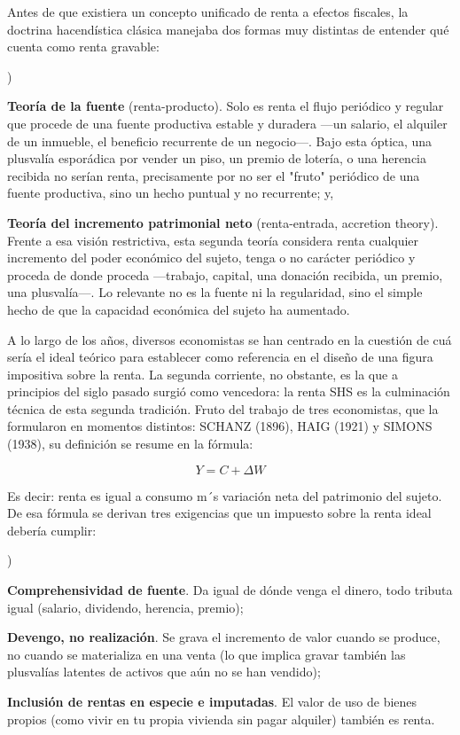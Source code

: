\documentclass[10pt,a4paper]{article}
\newcounter{alphaitem}
\newenvironment{la}
      {\begin{list}{\alph{alphaitem})}{%
          \usecounter{alphaitem}%
          \setlength{\leftmargin}{1cm}%
          \setlength{\parskip}{3pt}%
          \setlength{\itemsep}{0pt}%
          \setlength{\parsep}{0pt}%
      }}
      {\end{list}}
\begin{document}
Antes de que existiera un concepto unificado de renta a efectos fiscales, la doctrina hacendística clásica manejaba dos formas muy distintas de entender qué cuenta como renta gravable:
\begin{la}
    \item \textbf{Teoría de la fuente} (renta-producto). Solo es renta el flujo periódico y regular que procede de una fuente productiva estable y duradera —un salario, el alquiler de un inmueble, el beneficio recurrente de un negocio—. Bajo esta óptica, una plusvalía esporádica por vender un piso, un premio de lotería, o una herencia recibida no serían renta, precisamente por no ser el "fruto" periódico de una fuente productiva, sino un hecho puntual y no recurrente; y,
    \item \textbf{Teoría del incremento patrimonial neto} (renta-entrada, accretion theory). Frente a esa visión restrictiva, esta segunda teoría considera renta cualquier incremento del poder económico del sujeto, tenga o no carácter periódico y proceda de donde proceda —trabajo, capital, una donación recibida, un premio, una plusvalía—. Lo relevante no es la fuente ni la regularidad, sino el simple hecho de que la capacidad económica del sujeto ha aumentado.
\end{la}

A lo largo de los años, diversos economistas se han centrado en la cuestión de cuá sería el ideal teórico para establecer como referencia en el diseño de una figura impositiva sobre la renta. La segunda corriente, no obstante, es la que a principios del siglo pasado surgió como vencedora: la renta SHS es la culminación técnica de esta segunda tradición. Fruto del trabajo de tres economistas, que la formularon en momentos distintos: SCHANZ (1896), HAIG (1921) y SIMONS (1938), su definición se resume en la fórmula:

$$Y=C+\Delta W$$

Es decir: renta es igual a consumo m´s variación neta del patrimonio del sujeto. De esa fórmula se derivan tres exigencias que un impuesto sobre la renta ideal debería cumplir:
\begin{la}
    \item \textbf{Comprehensividad de fuente}. Da igual de dónde venga el dinero, todo tributa igual (salario, dividendo, herencia, premio);
    \item \textbf{Devengo, no realización}. Se grava el incremento de valor cuando se produce, no cuando se materializa en una venta (lo que implica gravar también las plusvalías latentes de activos que aún no se han vendido);
    \item \textbf{Inclusión de rentas en especie e imputadas}. El valor de uso de bienes propios (como vivir en tu propia vivienda sin pagar alquiler) también es renta.
\end{la}
\end{document}
